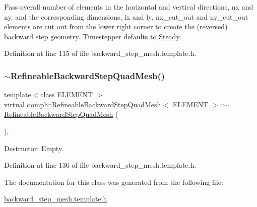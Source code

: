 Pass overall number of elements in the horizontal and vertical directions, nx and ny, and the corresponding dimensions, lx and ly. nx\+\_\+cut\+\_\+out and ny\+\_\+cut\+\_\+out elements are cut out from the lower right corner to create the (reversed) backward step geometry. Timestepper defaults to \hyperlink{classoomph_1_1Steady}{Steady}. 



Definition at line 115 of file backward\+\_\+step\+\_\+mesh.\+template.\+h.

\mbox{\label{classoomph_1_1RefineableBackwardStepQuadMesh_af30cb7d5ef893e64b184d540ed415e11}} 
\subsubsection{\texorpdfstring{$\sim$\+Refineable\+Backward\+Step\+Quad\+Mesh()}{~RefineableBackwardStepQuadMesh()}}
{\footnotesize\ttfamily template$<$class E\+L\+E\+M\+E\+NT $>$ \\
virtual \hyperlink{classoomph_1_1RefineableBackwardStepQuadMesh}{oomph\+::\+Refineable\+Backward\+Step\+Quad\+Mesh}$<$ E\+L\+E\+M\+E\+NT $>$\+::$\sim$\hyperlink{classoomph_1_1RefineableBackwardStepQuadMesh}{Refineable\+Backward\+Step\+Quad\+Mesh} (\begin{DoxyParamCaption}{ }\end{DoxyParamCaption})\hspace{0.3cm}{\ttfamily [inline]}, {\ttfamily [virtual]}}



Destructor\+: Empty. 



Definition at line 136 of file backward\+\_\+step\+\_\+mesh.\+template.\+h.



The documentation for this class was generated from the following file\+:\begin{DoxyCompactItemize}
\item 
\hyperlink{backward__step__mesh_8template_8h}{backward\+\_\+step\+\_\+mesh.\+template.\+h}\end{DoxyCompactItemize}
